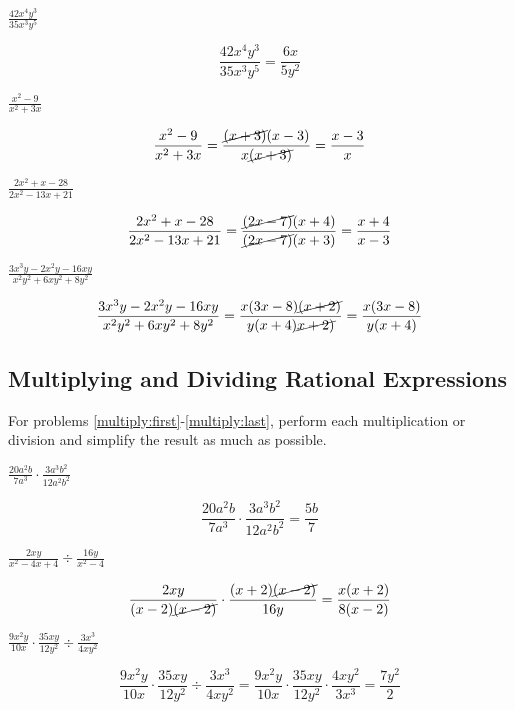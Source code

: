 \documentclass[fleqn,addpoints]{exam}
\begin{document}
\begin{questions}

\question[5] \( \displaystyle \frac{42x^4y^3}{35x^3y^5} \)
\label{simplify:first}
\begin{solution}[2 cm]
\[ 
\frac{42x^4y^3}{35x^3y^5} = \frac{6x}{5y^2}
\]
\end{solution}

\question[5] \( \displaystyle \frac{x^2-9}{x^2+3x} \)
\begin{solution}[2 cm]
\[
\frac{x^2-9}{x^2+3x}  = \frac{\cancel{(x+3)}(x-3)}{x \cancel{(x+3)}} = \frac{x-3}{x}
\]
\end{solution}

\question[5] \( \displaystyle \frac{2x^2+x-28}{2x^2-13x+21} \)
\begin{solution}[3 cm]
\[
  \frac{2x^2+x-28}{2x^2-13x+21} = \frac{\cancel{(2x-7)}(x+4)}{\cancel{(2x-7)}(x+3)} = \frac{x+4}{x-3}
\]
\end{solution}

\question[7] \( \displaystyle \frac{3x^3y - 2x^2y - 16xy}{x^2y^2 + 6xy^2 + 8y^2} \)
\label{simplify:last}
\begin{solution}[6 cm]
\[
  \frac{3x^3y - 2x^2y - 16xy}{x^2y^2 + 6xy^2 + 8y^2} 
  = \frac{x(3x-8) \cancel{(x+2)}} {y(x+4) \cancel{x+2)}} 
  = \frac{x(3x-8)}{y(x+4)} 
\]

\end{solution}

\subsection{Multiplying and Dividing Rational Expressions}

For problems \ref{multiply:first}-\ref{multiply:last}, perform each multiplication or division and simplify the result
as much as possible.

\question[7] \( \displaystyle \frac{20a^2b}{7a^3} \cdot \frac{3a^3b^2}{12a^2b^2} \)
\label{multiply:first}
\begin{solution}[3 cm]
\[
  \frac{20a^2b}{7a^3} \cdot \frac{3a^3b^2}{12a^2b^2}  = \frac{5b}{7}
\]
\end{solution}

\question[7] \( \displaystyle \frac{2xy}{x^2-4x+4} \div \frac{16y}{x^2-4}\)
\begin{solution}[4 cm]
\[
  \frac{2xy}{(x-2) \cancel{(x-2)}} \cdot \frac{(x+2) \cancel{(x-2)}}{16y} = \frac{x(x+2)}{8(x-2)}
\]
\end{solution}

\question[7] \( \displaystyle \frac{9x^2y}{10x} \cdot \frac{35xy}{12y^2} \div \frac{3x^3}{4xy^2} \)
\begin{solution}[3 cm]
\[
  \frac{9x^2y}{10x} \cdot \frac{35xy}{12y^2} \div \frac{3x^3}{4xy^2} 
  = \frac{9x^2y}{10x} \cdot \frac{35xy}{12y^2} \cdot \frac{4xy^2}{3x^3}
  = \frac{7y^2}{2}
\]
\end{solution}


\end{questions}
\end{document}
